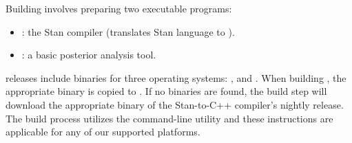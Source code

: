 Building \CmdStan involves preparing two executable programs:
%
\begin{itemize}
\item {}: the Stan compiler (translates Stan language to \Cpp).
\item {}: a basic posterior analysis tool.
\end{itemize}
%
\CmdStan releases include binaries for three operating systems: ,  and . When building \CmdStan, the appropriate binary is copied to . If no  binaries are found, the build step will download the appropriate binary of the Stan-to-C++ compiler's nightly release.
%
The build process utilizes the  command-line
utility and these instructions are applicable for any of our supported
platforms.

